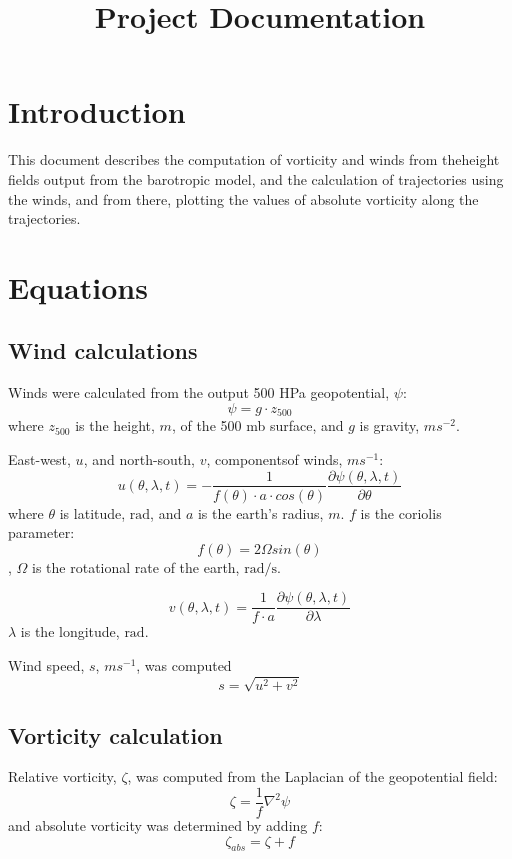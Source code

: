 \documentclass{article}
\begin{document}
\title{Project Documentation}
\section{Introduction}
This document describes the computation of vorticity and winds from theheight fields output from the barotropic model, and the calculation of trajectories using the winds, and from there, plotting the values of absolute vorticity along the trajectories.

\section{Equations}

\subsection{Wind calculations}
Winds were calculated from the output 500 HPa geopotential, $\psi$:
\begin{equation}
  \psi = g \cdot z_{500}
\end{equation}
where $z_{500}$ is the height, $m$, of the 500 mb surface, and $g$ is
gravity, $ms^{-2}$.

East-west, $u$, and north-south, $v$, componentsof winds, $ms^{-1}$:
\begin{equation}
  u(\theta, \lambda, t)  =
  - \frac{1}{f(\theta) \cdot a \cdot cos(\theta)}
  \frac{\partial \psi(\theta, \lambda, t)}{\partial \theta}
\end{equation}
where $\theta$ is latitude, $\text{rad}$, and $a$ is the earth's radius, $m$.
$f$ is the coriolis parameter:
\begin{equation}
  f(\theta) = 2 \Omega sin(\theta)
\end{equation},
 $\Omega$ is the rotational rate of the earth, $\text{rad/s}$.


\begin{equation}
  v(\theta, \lambda, t)  =  \frac{1}{f \cdot a }
  \frac{\partial \psi (\theta, \lambda, t)}{\partial \lambda}
\end{equation}
$\lambda$ is the longitude, $\text{rad}$.

Wind speed, $s$, $m s^{-1}$, was computed
 \begin{equation}
   s = \sqrt{u^2 + v^2}
   \end{equation}

\subsection{Vorticity calculation}
 Relative vorticity, $\zeta$, was computed from the Laplacian of the geopotential field:
 \begin{equation}
   \zeta = \frac{1}{f}\nabla^{2}\psi
 \end{equation}
 and absolute vorticity was determined by adding $f$:
 \begin{equation}
   \zeta_{abs} = \zeta + f
 \end{equation}
 
\end{document}
